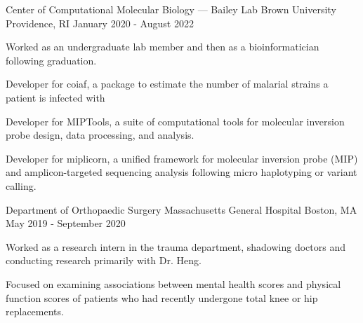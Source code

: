 \begin{cventries}
  \vspace{-0.5mm}
  \cventry
    {Center of Computational Molecular Biology — Bailey Lab} %
    {Brown University} %
    {Providence, RI} %
    {January 2020 - August 2022} %
    {
      \begin{cvitems} %
        \item {Worked as an undergraduate lab member and then as a 
        bioinformatician following graduation.}
        \item {Developer for coiaf, a package to estimate the number of malarial
        strains a patient is infected with}
        \item {Developer for MIPTools, a suite of computational tools for 
        molecular inversion probe design, data processing, and analysis.}
        \item {Developer for miplicorn, a unified framework for molecular
        inversion probe (MIP) and amplicon-targeted sequencing analysis following micro haplotyping or variant calling.}
      \end{cvitems}
    }

  \vspace{-0.5mm}
  \cventry
    {Department of Orthopaedic Surgery} %
    {Massachusetts General Hospital} %
    {Boston, MA} %
    {May 2019 - September 2020} %
    {
      \begin{cvitems} %
        \item {Worked as a research intern in the trauma department, shadowing 
        doctors and conducting research primarily with Dr. Heng.} 
        \item {Focused on examining associations between mental health scores
        and physical function scores of patients who had recently undergone 
        total knee or hip replacements.}
      \end{cvitems}
    }

\end{cventries}
